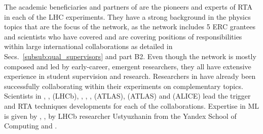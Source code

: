 The academic beneficiaries and partners of \acronym are 
the pioneers and experts of RTA in each of the LHC experiments. They have a strong
background in the physics topics that are the focus of the network, as the network includes 5 ERC grantees
and scientists who have covered and are covering positions of responsibilities within large
international collaborations as detailed in Secs.~\ref{subsub:qual_supervisors} and part B2.
Even though the network is mostly composed and led by early-career, emergent researchers, 
they all have extensive experience in student supervision and research. 
Researchers in \acronym have already been successfully collaborating within their experiments on complementary topics. 
Scientists in \nikhefentity, \cnrsentity, \dortmundentity (LHCb), \oregonentity, \ohioentity, \lundentity, \heidelbergentity (ATLAS),
\helsinkientity (ATLAS)  and \lundentity (ALICE) lead the trigger and RTA techniques
developments for each of the collaborations. Expertise in ML is given by \wildtreeentity, \unigeentity, 
by LHCb researcher Ustyuzhanin from the Yandex School of Computing and \cernentity.  

% 


